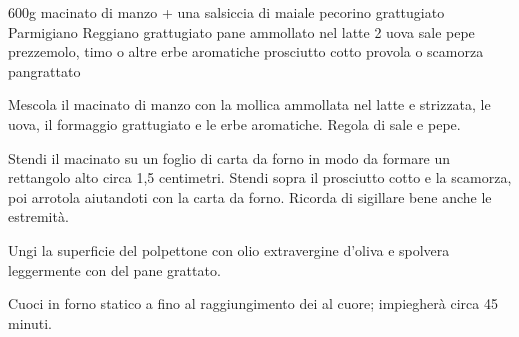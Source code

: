 \begin{ingreds}
	600g macinato di manzo + una salsiccia di maiale  
	pecorino grattugiato 
	Parmigiano Reggiano grattugiato 
	pane ammollato nel latte 
	2 uova 
	sale
	pepe
	prezzemolo, timo o altre erbe aromatiche
	prosciutto cotto
	provola o scamorza 
	pangrattato 
\end{ingreds}

\begin{method}
Mescola il macinato di manzo con la mollica ammollata nel latte e strizzata, le uova, il formaggio grattugiato e le erbe aromatiche. Regola di sale e pepe.

Stendi il macinato su un foglio di carta da forno in modo da formare un rettangolo alto circa 1,5 centimetri. Stendi sopra il prosciutto cotto e la scamorza, poi arrotola aiutandoti con la carta da forno. Ricorda di sigillare bene anche le estremità.

Ungi la superficie del polpettone con olio extravergine d'oliva e spolvera leggermente con del pane grattato.

Cuoci in forno statico a  fino al raggiungimento dei  al cuore; impiegherà circa 45 minuti.
\end {method}


